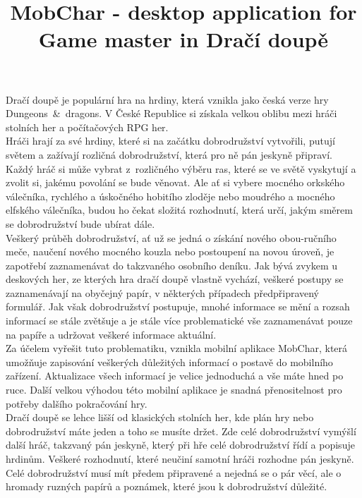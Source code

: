 \documentclass[thesis=B,czech]{FITthesis}[2012/06/26]
\title{	MobChar - desktop application for Game master in Dračí doupě}
\begin{document}

\begin{introduction}
Dračí doupě je populární hra na hrdiny, která vznikla jako česká verze hry Dungeons~\&~dragons. V České Republice si získala velkou oblibu mezi hráči stolních her a počítačových RPG her.\\

Hráči hrají za své hrdiny, které si na začátku dobrodružství vytvořili, putují světem a zažívají rozličná dobrodružství, která pro ně pán jeskyně připraví. Každý hráč si může vybrat z~rozličného výběru ras, které se ve světě vyskytují a zvolit si, jakému povolání se bude věnovat. Ale ať si vybere mocného orkského válečníka, rychlého a úskočného hobitího zloděje nebo moudrého a mocného elfského válečníka, budou ho čekat složitá rozhodnutí, která určí, jakým směrem se dobrodružství bude ubírat dále. \\

Veškerý průběh dobrodružství, ať už se jedná o získání nového obou-ručního meče, naučení nového mocného kouzla nebo postoupení na novou úroveň, je zapotřebí zaznamenávat do takzvaného osobního deníku. Jak bývá zvykem u deskových her, ze kterých hra dračí doupě vlastně vychází, veškeré postupy se zaznamenávají na obyčejný papír, v některých případech předpřipravený formulář. Jak však dobrodružství postupuje, mnohé informace se mění a rozsah informací se stále zvětšuje a je stále více problematické vše zaznamenávat pouze na papíře a udržovat veškeré informace aktuální.\\

Za účelem vyřešit tuto problematiku, vznikla mobilní aplikace MobChar, která umožňuje zapisování veškerých důležitých informací o postavě do mobilního zařízení. Aktualizace všech informací je velice jednoduchá a vše máte hned po ruce. Další velkou výhodou této mobilní aplikace je snadná přenositelnost pro potřeby dalšího pokračování hry. \\

Dračí doupě se lehce lišší od klasických stolních her, kde plán hry nebo dobrodružství máte jeden a toho se musíte držet. Zde celé dobrodružství vymýšlí další hráč, takzvaný pán jeskyně, který při hře celé dobrodružství řídí a popisuje hrdinům. Veškeré rozhodnutí, které neučiní samotní hráči rozhodne pán jeskyně. Celé dobrodružství musí mít předem připravené a nejedná se o pár věcí, ale o hromady ruzných papírů a poznámek, které jsou k dobrodružství důležité. 
\end{introduction}
\end{document}
